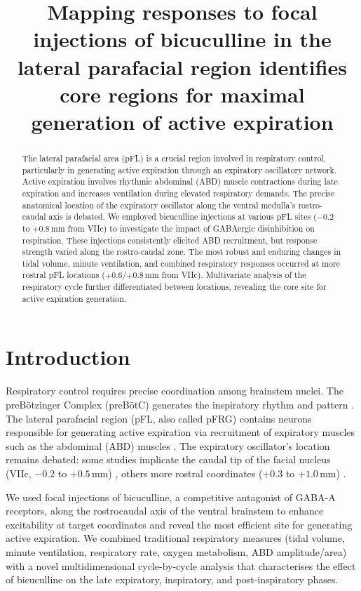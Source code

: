 \documentclass[11pt]{article}
\title{Mapping responses to focal injections of bicuculline in the lateral parafacial region identifies core regions for maximal generation of active expiration}
\author{}
\date{}
\begin{document}
\maketitle

\begin{abstract}
The lateral parafacial area (pFL) is a crucial region involved in respiratory control, particularly in generating active expiration through an expiratory oscillatory network. Active expiration involves rhythmic abdominal (ABD) muscle contractions during late expiration and increases ventilation during elevated respiratory demands. The precise anatomical location of the expiratory oscillator along the ventral medulla's rostro-caudal axis is debated. We employed bicuculline injections at various pFL sites ($-0.2$ to $+0.8$\,mm from VIIc) to investigate the impact of GABAergic disinhibition on respiration. These injections consistently elicited ABD recruitment, but response strength varied along the rostro-caudal zone. The most robust and enduring changes in tidal volume, minute ventilation, and combined respiratory responses occurred at more rostral pFL locations ($+0.6$/$+0.8$\,mm from VIIc). Multivariate analysis of the respiratory cycle further differentiated between locations, revealing the core site for active expiration generation.
\end{abstract}

\section{Introduction}
Respiratory control requires precise coordination among brainstem nuclei. The preB\"otzinger Complex (preB\"otC) generates the inspiratory rhythm and pattern \citep{gray2001,smith1991,tan2008,wang2014}. The lateral parafacial region (pFL, also called pFRG) contains neurons responsible for generating active expiration via recruitment of expiratory muscles such as the abdominal (ABD) muscles \citep{debritto2017,huckstepp2015,pagliardini2011,pisanski2019}. The expiratory oscillator's location remains debated: some studies implicate the caudal tip of the facial nucleus (VIIc, $-0.2$ to $+0.5$\,mm) \citep{huckstepp2015,pisanski2019}, others more rostral coordinates ($+0.3$ to $+1.0$\,mm) \citep{silva2019}.

We used focal injections of bicuculline, a competitive antagonist of GABA-A receptors, along the rostrocaudal axis of the ventral brainstem to enhance excitability at target coordinates and reveal the most efficient site for generating active expiration. We combined traditional respiratory measures (tidal volume, minute ventilation, respiratory rate, oxygen metabolism, ABD amplitude/area) with a novel multidimensional cycle-by-cycle analysis that characterises the effect of bicuculline on the late expiratory, inspiratory, and post-inspiratory phases.
\end{document}
